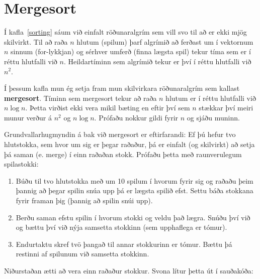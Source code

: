 

\section {Mergesort}

Í kafla~\ref{sorting} sáum við einfalt röðunaralgrím sem vill svo til að er ekki mjög skilvirkt.
Til að raða $n$ hlutum (spilum) þarf algrímið að ferðast um í vektornum $n$ sinnum (for-lykkjan)
og sérhver umferð (finna lægsta spil) tekur tíma sem er í réttu hlutfalli við $n$.
Heildartíminn sem algrímið tekur er því í réttu hlutfalli við $n^2$.

Í þessum kafla mun ég setja fram mun skilvirkara röðunaralgrím sem kallast {\bf mergesort}.
Tíminn sem mergesort tekur að raða $n$ hlutum er í réttu hlutfalli við $n \log n$.
Þetta virðist ekki vera mikil bæting en eftir því sem $n$ stækkar því meiri munur verður á $n^2$ og $n \log n$.
Prófaðu nokkur gildi fyrir $n$ og sjáðu muninn. 

Grundvallarhugmyndin á bak við mergesort er eftirfarandi:
Ef þú hefur tvo hlutstokka, sem hvor um sig er þegar raðaður, þá er einfalt (og skilvirkt) að setja þá saman (e. merge) í einn raðaðan stokk.
Prófaðu þetta með raunverulegum spilastokki:

\begin{enumerate}

\item Búðu til tvo hlutstokka með um 10 spilum í hvorum fyrir sig og raðaðu þeim þannig að þegar spilin snúa upp þá er lægsta spilið efst.
Settu báða stokkana fyrir framan þig (þannig að spilin snúi upp). 

\item Berðu saman efstu spilin í hvorum stokki og veldu það lægra. 
Snúðu því við og bættu því við nýja samsetta stokkinn (sem upphaflega er tómur). 

\item Endurtaktu skref tvö þangað til annar stokkurinn er tómur. 
Bættu þá restinni af spilunum við samsetta stokkinn. 

\end{enumerate}

Niðurstaðan ætti að vera einn raðaður stokkur.
Svona lítur þetta út í sauðakóða:

